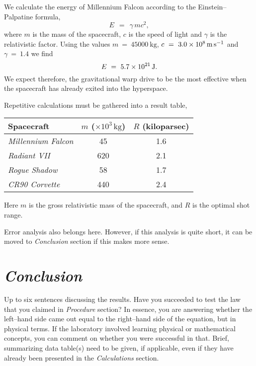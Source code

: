 \documentclass[epsfig,12pt]{article}
\begin{document}
	We calculate the energy of Millennium Falcon according to the Einstein--Palpatine formula,
\[
	E  ~~=~~  \gamma\, m c^2,
\]
	where $ m $ is the mass of the spacecraft, $ c $ is the speed of light
	and $ \gamma $ is the relativistic factor.
	Using the values $ m ~=~ \SI{45000}{\kg} $, $ c ~=~ \SI{3.0d8}{\metre\per\second} $
	and $ \gamma ~=~ 1.4 $ we find
\[
 	E ~=~ \SI{5.7d21}{\joule}.
\]
	We expect therefore, the gravitational warp drive to be the most effective
	when the spacecraft has already exited into the hyperspace.

	Repetitive calculations must be gathered into a result table,
\begin{center}
\begin{tabular}{lcc}
%
\toprule
%
	Spacecraft			&	$ m $ ($\times 10^3\,\si{\kg}$)	&	$ R $ (kiloparsec)	\\[2mm]
%
\midrule
%
	\textsl{Millennium Falcon}	&	45	&	1.6	\\[2mm]
	\textsl{Radiant VII}		&	620	&	2.1	\\[2mm]
	\textsl{Rogue Shadow}		&	58	&	1.7	\\[2mm]
	\textsl{CR90 Corvette}		&	440	&	2.4	\\[2mm]
%
\bottomrule
\end{tabular}
\end{center}
	Here $ m $ is the gross relativistic mass of the spacecraft, and $ R $ is the optimal shot range.

	Error analysis also belongs here.
	However, if this analysis is quite short, it can be moved to \emph{Conclusion} section
	if this makes more sense.


\section*{\textit{Conclusion}}

	Up to six sentences discussing the results.
	Have you succeeded to test the law that you claimed in \emph{Procedure} section?
	In essence, you are answering whether the left--hand side came out equal to the right--hand side of the equation,
	but in physical terms.
	If the laboratory involved learning physical or mathematical concepts, you can comment on whether
	you were successful in that.
	Brief, summarizing data table(s) need to be given, if applicable, even if they have already been
	presented in the \textit{Calculations} section.
\end{document}

